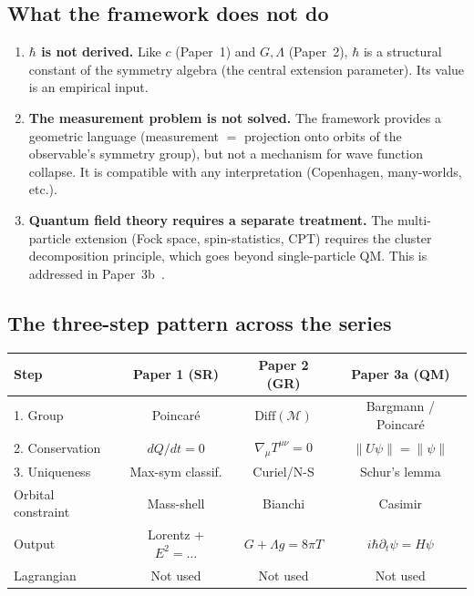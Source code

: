 \documentclass[12pt]{article}
\theoremstyle{plain}
\theoremstyle{definition}
\theoremstyle{remark}
\newcommand{\Diff}{\mathrm{Diff}}
\begin{document}
\subsection{What the framework does not do}

\begin{enumerate}[label=(\roman*)]
    \item \textbf{$\hbar$ is not derived.} Like $c$ (Paper~1) and $G, \Lambda$ (Paper~2), $\hbar$ is a structural constant of the symmetry algebra (the central extension parameter). Its value is an empirical input.
    \item \textbf{The measurement problem is not solved.} The framework provides a geometric language (measurement $=$ projection onto orbits of the observable's symmetry group), but not a mechanism for wave function collapse. It is compatible with any interpretation (Copenhagen, many-worlds, etc.).
    \item \textbf{Quantum field theory requires a separate treatment.} The multi-particle extension (Fock space, spin-statistics, CPT) requires the cluster decomposition principle, which goes beyond single-particle QM. This is addressed in Paper~3b~\cite{nembe2026p3b}.
\end{enumerate}

\subsection{The three-step pattern across the series}

\begin{center}\small
\begin{tabular}{lccc}\toprule
\textbf{Step} & \textbf{Paper 1 (SR)} & \textbf{Paper 2 (GR)} & \textbf{Paper 3a (QM)} \\\midrule
1. Group & Poincar\'e & $\Diff(\mathcal{M})$ & Bargmann / Poincar\'e \\
2. Conservation & $dQ/dt = 0$ & $\nabla_\mu T^{\mu\nu} = 0$ & $\|U\psi\| = \|\psi\|$ \\
3. Uniqueness & Max-sym classif. & Curiel/N-S & Schur's lemma \\
\midrule
Orbital constraint & Mass-shell & Bianchi & Casimir \\
Output & Lorentz + $E^2 = \ldots$ & $G + \Lambda g = 8\pi T$ & $i\hbar\partial_t\psi = H\psi$ \\
Lagrangian & Not used & Not used & Not used \\
\bottomrule
\end{tabular}
\end{center}
\end{document}
